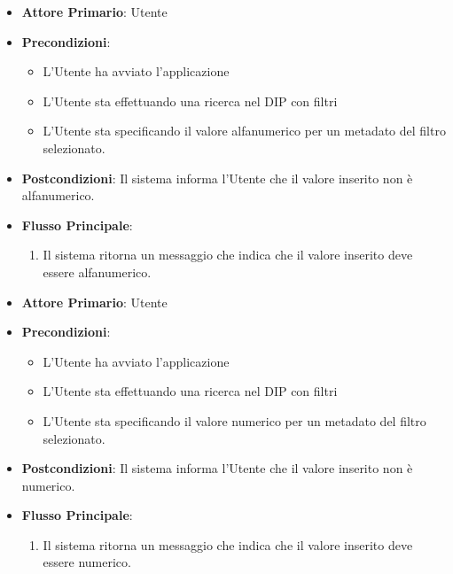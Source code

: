 \begin{itemize}
      \item \textbf{Attore Primario}: Utente
      \item \textbf{Precondizioni}: \begin{itemize}
            \item L'Utente ha avviato l'applicazione
            \item L'Utente sta effettuando una ricerca nel DIP con filtri
            \item L'Utente sta specificando il valore alfanumerico per un metadato del filtro selezionato.
      \end{itemize}
      \item \textbf{Postcondizioni}: Il sistema informa l'Utente che il valore inserito non è alfanumerico.
      \item \textbf{Flusso Principale}:
      \begin{enumerate}
            \item Il sistema ritorna un messaggio che indica che il valore inserito deve essere alfanumerico.
      \end{enumerate}
\end{itemize}

\begin{itemize}
      \item \textbf{Attore Primario}: Utente
      \item \textbf{Precondizioni}: \begin{itemize}
            \item L'Utente ha avviato l'applicazione
            \item L'Utente sta effettuando una ricerca nel DIP con filtri
            \item L'Utente sta specificando il valore numerico per un metadato del filtro selezionato.
      \end{itemize}
      \item \textbf{Postcondizioni}: Il sistema informa l'Utente che il valore inserito non è numerico.
      \item \textbf{Flusso Principale}:
      \begin{enumerate}
            \item Il sistema ritorna un messaggio che indica che il valore inserito deve essere numerico.
      \end{enumerate}
\end{itemize}
